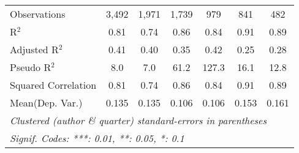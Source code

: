 \begin{tabular}{lcccccc}
   Observations                                               & 3,492       & 1,971   & 1,739   & 979          & 841         & 482\\  
   R$^2$                                                      & 0.81        & 0.74    & 0.86    & 0.84         & 0.91        & 0.89\\  
   Adjusted R$^2$                                             & 0.41        & 0.40    & 0.35    & 0.42         & 0.25        & 0.28\\  
   Pseudo R$^2$                                               & 8.0         & 7.0     & 61.2    & 127.3        & 16.1        & 12.8\\  
   Squared Correlation                                        & 0.81        & 0.74    & 0.86    & 0.84         & 0.91        & 0.89\\  
Mean(Dep. Var.) & 0.135 & 0.135 & 0.106 & 0.106 & 0.153 & 0.161 \\
   \midrule \midrule
   \multicolumn{7}{l}{\emph{Clustered (author \& quarter) standard-errors in parentheses}}\\
   \multicolumn{7}{l}{\emph{Signif. Codes: ***: 0.01, **: 0.05, *: 0.1}}\\
\end{tabular}
\par\endgroup
